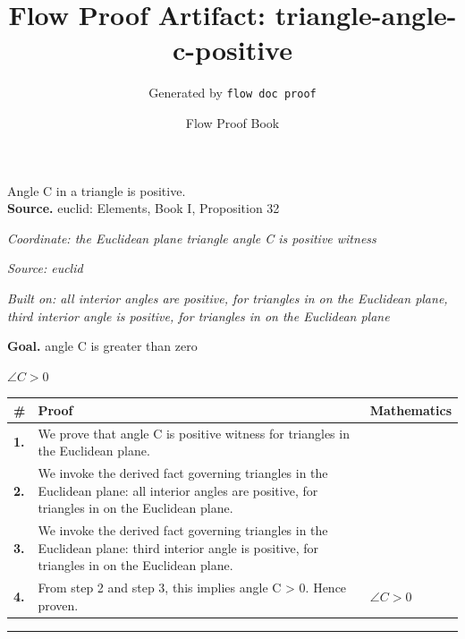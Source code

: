 \documentclass[11pt]{article}
\title{Flow Proof Artifact: triangle-angle-c-positive}
\author{Generated by \texttt{flow doc proof}}
\date{Flow Proof Book}
\theoremstyle{definition}
\begin{document}
\maketitle
Angle C in a triangle is positive.\\[0.5em]
\textbf{Source.} euclid: Elements, Book I, Proposition 32\\[0.5em]
\bigskip
{}\par
\smallskip\noindent\textit{Coordinate: the Euclidean plane \cdot triangle \cdot angle C is positive witness}\par
\smallskip\noindent\textit{Source: euclid}\par
\smallskip\noindent\textit{Built on: all interior angles are positive, for triangles in on the Euclidean plane, third interior angle is positive, for triangles in on the Euclidean plane}\par
\medskip
\noindent\textbf{Goal.} angle C is greater than zero\par
\noindent$\displaystyle \angle C > 0$\par
\medskip
\noindent
\begin{tabular}{@{} >{\raggedright\arraybackslash}p{} >{\raggedright\arraybackslash}p{} >{\raggedleft\arraybackslash}p{} @{}}
\textbf{\#} & \textbf{Proof} & \textbf{Mathematics} \\
\midrule
\textbf{1.} & We prove that angle C is positive witness for triangles in the Euclidean plane. & \\[0.45em]
\textbf{2.} & We invoke the derived fact governing triangles in the Euclidean plane: all interior angles are positive, for triangles in on the Euclidean plane. & \\[0.45em]
\textbf{3.} & We invoke the derived fact governing triangles in the Euclidean plane: third interior angle is positive, for triangles in on the Euclidean plane. & \\[0.45em]
\textbf{4.} & From step 2 and step 3, this implies angle C > 0. Hence proven. & $\displaystyle \angle C > 0$ \\[0.45em]
\bottomrule
\end{tabular}
\label{thm:Geometry-triangle-angle_c_is_positive_witness}
\par\medskip\hrule
\end{document}
